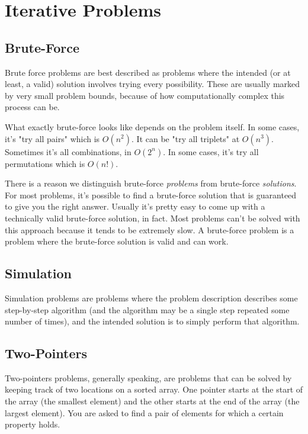 \section{Iterative Problems}
\subsection{Brute-Force}

Brute force problems are best described as problems where the intended (or at least, a valid) solution involves trying every possibility. These are usually marked by very small problem bounds, because of how computationally complex this process can be.

What exactly brute-force looks like depends on the problem itself. In some cases, it's "try all pairs" which is $O(n^2)$. It can be "try all triplets" at $O(n^3)$. Sometimes it's all combinations, in $O(2^n)$. In some cases, it's try all permutations which is $O(n!)$.

There is a reason we distinguish brute-force \textit{problems} from brute-force \textit{solutions}. For most problems, it's possible to find a brute-force solution that is guaranteed to give you the right answer. Usually it's pretty easy to come up with a technically valid brute-force solution, in fact. Most problems can't be solved with this approach because it tends to be extremely slow. A brute-force problem is a problem where the brute-force solution is valid and can work.

\subsection{Simulation}

Simulation problems are problems where the problem description describes some step-by-step algorithm (and the algorithm may be a single step repeated some number of times), and the intended solution is to simply perform that algorithm.

\hrulefill



\hrulefill

\subsection{Two-Pointers}

Two-pointers problems, generally speaking, are problems that can be solved by keeping track of two locations on a sorted array. One pointer starts at the start of the array (the smallest element) and the other starts at the end of the array (the largest element). You are asked to find a pair of elements for which a certain property holds.

